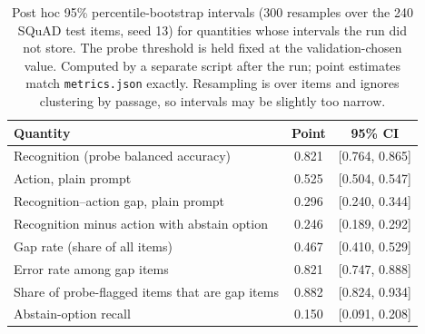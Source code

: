 \begin{table}[H]
\centering\small
\caption{Post hoc 95\% percentile-bootstrap intervals (300 resamples over the 240 SQuAD test items, seed 13) for quantities whose intervals the run did not store. The probe threshold is held fixed at the validation-chosen value. Computed by a separate script after the run; point estimates match \texttt{metrics.json} exactly. Resampling is over items and ignores clustering by passage, so intervals may be slightly too narrow.}
\label{tab:posthoc}
\begin{tabular}{@{}lcc@{}}
\toprule
Quantity & Point & 95\% CI \\
\midrule
Recognition (probe balanced accuracy) & 0.821 & [0.764, 0.865] \\
Action, plain prompt & 0.525 & [0.504, 0.547] \\
Recognition--action gap, plain prompt & 0.296 & [0.240, 0.344] \\
Recognition minus action with abstain option & 0.246 & [0.189, 0.292] \\
Gap rate (share of all items) & 0.467 & [0.410, 0.529] \\
Error rate among gap items & 0.821 & [0.747, 0.888] \\
Share of probe-flagged items that are gap items & 0.882 & [0.824, 0.934] \\
Abstain-option recall & 0.150 & [0.091, 0.208] \\
\bottomrule
\end{tabular}
\end{table}
